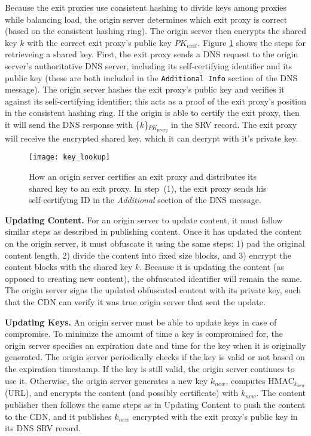 Because the exit proxies use consistent hashing to divide keys among proxies while
balancing load, the origin server
determines which exit proxy is correct (based on the consistent hashing ring). 
The origin server then encrypts the
shared key $k$ with the correct exit proxy's public key $PK_{exit}$.  
Figure \ref{fig:keys} shows the steps for retrieveing a shared key.  First, the
exit proxy sends a DNS request to the origin server's authoritative DNS server, including its self-certifying
identifier and its public key (these are both included in the {\tt Additional Info} section of the DNS message).  The origin server hashes the exit 
proxy's public key and verifies it against its self-certifying identifier; this acts as a proof of the 
exit proxy's position in the consistent hashing ring.  If the origin is able to
certify the exit proxy, then it will send the DNS response with
\{$k$\}$_{PK_{proxy}}$ in the SRV record. The exit proxy will receive the encrypted shared key, which it can decrypt with it's private key.

\begin{figure}[t]
\centering
\texttt{[image: key\_lookup]}
\caption{How an origin server certifies an exit proxy and distributes its shared
key to an exit proxy.  In step~(1), 
the exit proxy sends his self-certifying ID in the {\it Additional} section of the DNS message.  }
\label{fig:keys}
\end{figure}

\textbf{Updating Content.}
For an origin server to update content, it must follow similar steps as described
in publishing content.  
Once it has updated the content on the origin server, it must obfuscate it using
the same steps: 1) pad the 
original content length, 2) divide the content into fixed size blocks, and 3) encrypt the content blocks 
with the shared key $k$.  Because it is updating the content (as opposed to creating
new content), the 
obfuscated identifier will remain the same.  The origin server signs the updated obfuscated content with 
its private key, such that the CDN can verify it was true origin server that sent
the update.

\textbf{Updating Keys.}
An origin server must be able to update keys in case of compromise.  To minimize the amount of time a key is compromised for, the 
origin server specifies an expiration date and time for the key when it is originally generated.  The origin server 
periodically checks if the key is valid or not based on the expiration timestamp.  If the key is still valid, the origin server 
continues to use it.  Otherwise, the origin server generates a new key $k_{new}$, computes HMAC$_{k_{new}}$(URL), and 
encrypts the content (and possibly certificate) with $k_{new}$.  The content publisher then follows the same steps as in Updating 
Content to push the content to the CDN, and it publishes $k_{new}$ encrypted with the exit proxy's public key in its DNS SRV record.

